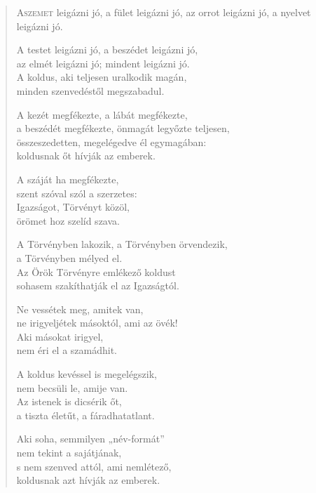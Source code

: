 
\begin{verse}

{\par%
\lettrine[slope=0.5em]{A}{szemet} {\LettrineTextFont leigázni jó,}\newline
a fület leigázni jó,\newline
az orrot leigázni jó,\verselinebreak
a nyelvet leigázni jó.
\par}

 A testet leigázni jó, a beszédet leigázni jó,\\
az elmét leigázni jó; mindent leigázni jó.\\
A koldus, aki teljesen uralkodik magán,\\
minden szenvedéstől megszabadul.

 A kezét megfékezte, a lábát megfékezte,\\
a beszédét megfékezte, önmagát legyőzte teljesen,\\
összeszedetten, megelégedve él egymagában:\\
koldusnak őt hívják az emberek.

 A száját ha megfékezte,\\
szent szóval szól a szerzetes:\\
Igazságot, Törvényt közöl,\\
örömet hoz szelíd szava.

 A Törvényben lakozik, a Törvényben örvendezik,\\
a Törvényben mélyed el.\\
Az Örök Törvényre emlékező koldust\\
sohasem szakíthatják el az Igazságtól.

 Ne vessétek meg, amitek van,\\
ne irigyeljétek másoktól, ami az övék!\\
Aki másokat irigyel,\\
nem éri el a szamádhit.

 A koldus kevéssel is megelégszik,\\
nem becsüli le, amije van.\\
Az istenek is dicsérik őt,\\
a tiszta életűt, a fáradhatatlant.

 Aki soha, semmilyen „név-formát”\\
nem tekint a sajátjának,\\
s nem szenved attól, ami nemlétező,\\
koldusnak azt hívják az emberek.


\end{verse}

